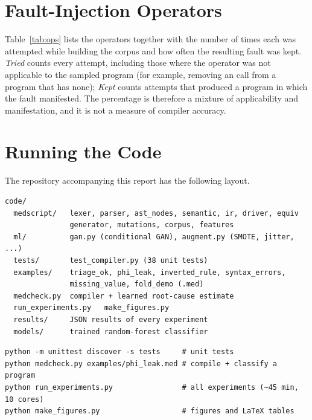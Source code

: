 \section{Fault-Injection Operators}

Table~\ref{tab:ops} lists the operators together with the number of times each was attempted while building the
corpus and how often the resulting fault was kept. \emph{Tried} counts every attempt, including those where the
operator was not applicable to the sampled program (for example, removing an  call from a program
that has none); \emph{Kept} counts attempts that produced a program in which the fault manifested. The percentage is
therefore a mixture of applicability and manifestation, and it is not a measure of compiler accuracy.

{\small

}

\section{Running the Code}

The repository accompanying this report has the following layout.

\begin{lstlisting}[language={},numbers=none,basicstyle=\ttfamily\footnotesize]
code/
  medscript/   lexer, parser, ast_nodes, semantic, ir, driver, equiv
               generator, mutations, corpus, features
  ml/          gan.py (conditional GAN), augment.py (SMOTE, jitter, ...)
  tests/       test_compiler.py (38 unit tests)
  examples/    triage_ok, phi_leak, inverted_rule, syntax_errors,
               missing_value, fold_demo (.med)
  medcheck.py  compiler + learned root-cause estimate
  run_experiments.py   make_figures.py
  results/     JSON results of every experiment
  models/      trained random-forest classifier
\end{lstlisting}

\begin{lstlisting}[language={},numbers=none,basicstyle=\ttfamily\footnotesize]
python -m unittest discover -s tests     # unit tests
python medcheck.py examples/phi_leak.med # compile + classify a program
python run_experiments.py                # all experiments (~45 min, 10 cores)
python make_figures.py                   # figures and LaTeX tables
\end{lstlisting}
